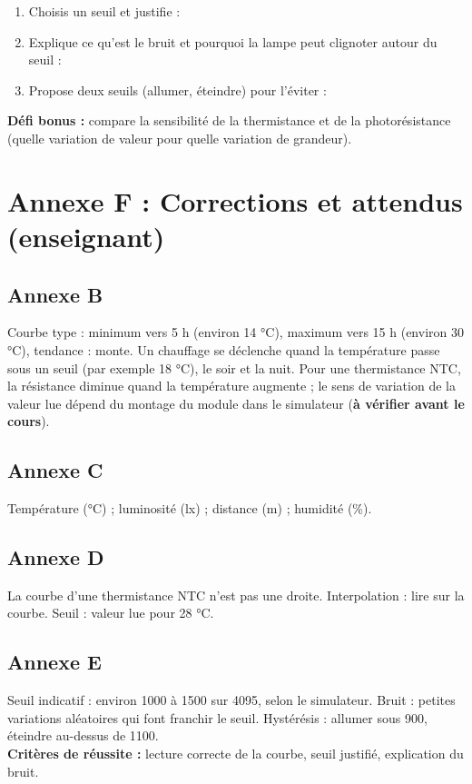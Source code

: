 \documentclass[11pt,a4paper]{article}
\begin{document}
\begin{enumerate}
 \item Choisis un seuil et justifie : \lig
 \item Explique ce qu'est le bruit et pourquoi la lampe peut clignoter autour du seuil : \lig \lig
 \item Propose deux seuils (allumer, éteindre) pour l'éviter : \dotfill
\end{enumerate}

\textbf{Défi bonus :} compare la sensibilité de la thermistance et de la photorésistance (quelle variation de valeur pour quelle variation de grandeur).

\newpage
\section*{Annexe F : Corrections et attendus (enseignant)}

\subsection*{Annexe B}
Courbe type : minimum vers 5 h (environ 14 °C), maximum vers 15 h (environ 30 °C), tendance : monte. Un chauffage se déclenche quand la température passe sous un seuil (par exemple 18 °C), le soir et la nuit. Pour une thermistance NTC, la résistance diminue quand la température augmente ; le sens de variation de la valeur lue dépend du montage du module dans le simulateur (\textbf{à vérifier avant le cours}).

\subsection*{Annexe C}
Température (°C) ; luminosité (lx) ; distance (m) ; humidité (\%).

\subsection*{Annexe D}
La courbe d'une thermistance NTC n'est pas une droite. Interpolation : lire sur la courbe. Seuil : valeur lue pour 28 °C.

\subsection*{Annexe E}
Seuil indicatif : environ 1000 à 1500 sur 4095, selon le simulateur. Bruit : petites variations aléatoires qui font franchir le seuil. Hystérésis : allumer sous 900, éteindre au-dessus de 1100.\\
\textbf{Critères de réussite :} lecture correcte de la courbe, seuil justifié, explication du bruit.
\end{document}
